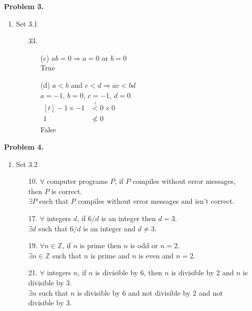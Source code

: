 \documentclass[letterpaper,fleqn]{article}
\begin{document}
\begin{enumerate}
		\item [] \textbf{Problem 3.}
		\begin{enumerate}[]
			\item Set 3.1
			\begin{enumerate}
				\item [33.] \quad
				\begin{enumerate}
					\item [(c)]
					$ab = 0 \Rightarrow a = 0$ or $b=0$ \\
					True
					
					\item [(d)]
					$a < b$ and $c < d \Rightarrow ac < bd$ \\
					$a=-1$, $b=0$, $c=-1$, $d=0$ \\
					$\begin{aligned}[t]
						-1 \times -1 & \stackrel{?}{<} 0 \times 0 \\
						1 & \not < 0
					\end{aligned}$ \\
					False
				\end{enumerate}
			\end{enumerate}
		\end{enumerate}
		
		\item [] \textbf{Problem 4.}
		\begin{enumerate}[]
			\item Set 3.2
			\begin{enumerate}
				\item [10.]
				$\forall$ computer programs $P$, if $P$ compiles without error messages, then $P$ is correct. \\
				$\exists P$ such that $P$ compiles without error messages and isn't correct.
				
				\item [17.]
				$\forall$ integers $d$, if $6/d$ is an integer then $d=3$. \\
				$\exists d$ such that $6/d$ is an integer and $d \not= 3$.
				
				\item [19.]
				$\forall n \in \mathbb{Z}$, if $n$ is prime then $n$ is odd or $n=2$. \\
				$\exists n \in \mathbb{Z}$ such that $n$ is prime and $n$ is even and $n=2$.
				
				\item [21.]
				$\forall$ integers $n$, if $n$ is divisible by 6, then $n$ is divisible by 2 and $n$ is divisible by 3. \\
				$\exists n$ such that $n$ is divisible by 6 and not divisible by 2 and not divisible by 3. 
				

\end{enumerate}
\end{enumerate}
\end{enumerate}
\end{document}
